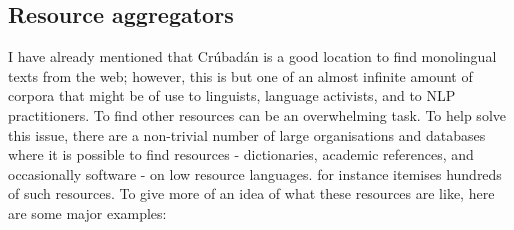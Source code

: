 \subsection{Resource aggregators}
\label{subsec:resource-aggregators}

I have already mentioned that Cr\'ubad\'an \citep{scannell2007crubadan} is a good location to find monolingual texts from the web; however, this is but one of an almost infinite amount of corpora that might be of use to linguists, language activists, and to NLP practitioners. To find other resources can be an overwhelming task. To help solve this issue, there are a non-trivial number of large organisations and databases where it is possible to find resources - dictionaries, academic references, and occasionally software - on low resource languages. \citet{unesco11directory} for instance itemises hundreds of such resources. To give more of an idea of what these resources are like, here are some major examples:


